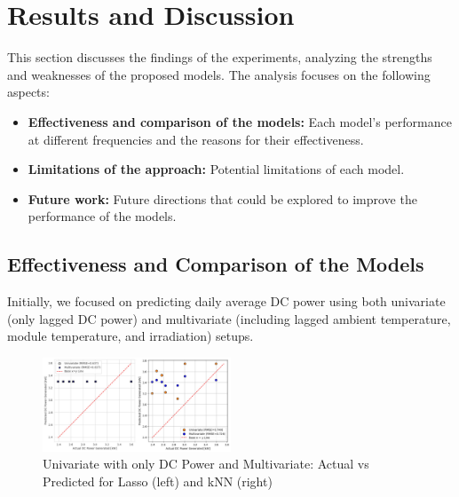 \section{Results and Discussion}

This section discusses the findings of the experiments, analyzing the strengths and weaknesses of the proposed models. The analysis focuses on the following aspects:

\begin{itemize}
    \item \textbf{Effectiveness and comparison of the models:} Each model's performance at different frequencies and the reasons for their effectiveness.
    
    \item \textbf{Limitations of the approach:} Potential limitations of each model.
    
    \item \textbf{Future work:} Future directions that could be explored to improve the performance of the models.
\end{itemize}

\subsection{Effectiveness and Comparison of the Models}

Initially, we focused on predicting daily average DC power using both univariate (only lagged DC power) and multivariate (including lagged ambient temperature, module temperature, and irradiation) setups.

\begin{figure}[h]
    \centering
    \includegraphics[width=0.5\textwidth]{Figures/uni-multi.jpg}
    \caption{Univariate with only DC Power and Multivariate: Actual vs Predicted for Lasso (left) and kNN (right)}
    \label{fig:uni-multi}
\end{figure}


